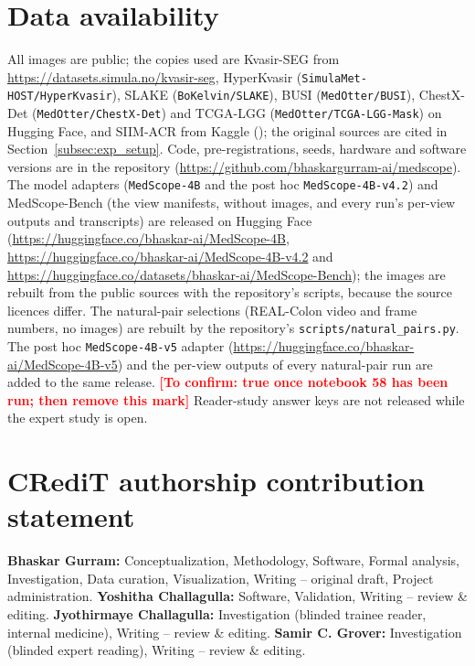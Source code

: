 \documentclass[5p,times,twocolumn,authoryear]{elsarticle}
\newcommand{\toconfirm}[1]{\textcolor{red}{\textbf{[To confirm: #1]}}}
\begin{document}
\section*{Data availability}
All images are public; the copies used are Kvasir-SEG from \url{https://datasets.simula.no/kvasir-seg}, HyperKvasir (\texttt{SimulaMet-HOST/HyperKvasir}), SLAKE (\texttt{BoKelvin/SLAKE}), BUSI (\texttt{MedOtter/BUSI}), ChestX-Det (\texttt{MedOtter/ChestX-Det}) and TCGA-LGG (\texttt{MedOtter/TCGA-LGG-Mask}) on Hugging Face, and SIIM-ACR from Kaggle (); the original sources are cited in Section~\ref{subsec:exp_setup}. Code, pre-registrations, seeds, hardware and software versions are in the repository (\url{https://github.com/bhaskargurram-ai/medscope}). The model adapters (\texttt{MedScope-4B} and the post hoc \texttt{MedScope-4B-v4.2}) and MedScope-Bench (the view manifests, without images, and every run's per-view outputs and transcripts) are released on Hugging Face (\url{https://huggingface.co/bhaskar-ai/MedScope-4B}, \url{https://huggingface.co/bhaskar-ai/MedScope-4B-v4.2} and \url{https://huggingface.co/datasets/bhaskar-ai/MedScope-Bench}); the images are rebuilt from the public sources with the repository's scripts, because the source licences differ. The natural-pair selections (REAL-Colon video and frame numbers, no images) are rebuilt by the repository's \texttt{scripts/natural\_pairs.py}. The post hoc \texttt{MedScope-4B-v5} adapter (\url{https://huggingface.co/bhaskar-ai/MedScope-4B-v5}) and the per-view outputs of every natural-pair run are added to the same release. \toconfirm{true once notebook 58 has been run; then remove this mark} Reader-study answer keys are not released while the expert study is open.


\section*{CRediT authorship contribution statement}
\textbf{Bhaskar Gurram:} Conceptualization, Methodology, Software, Formal analysis, Investigation, Data curation, Visualization, Writing -- original draft, Project administration.
\textbf{Yoshitha Challagulla:} Software, Validation, Writing -- review \& editing.
\textbf{Jyothirmaye Challagulla:} Investigation (blinded trainee reader, internal medicine), Writing -- review \& editing.
\textbf{Samir C. Grover:} Investigation (blinded expert reading), Writing -- review \& editing.
\end{document}
